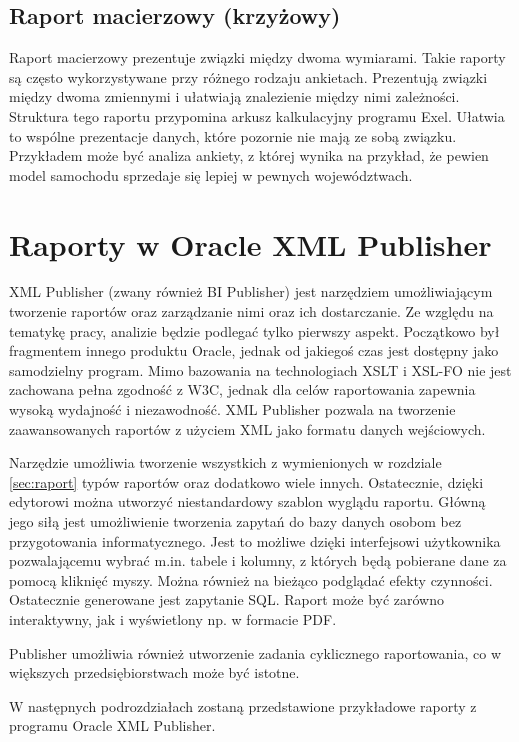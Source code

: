 \documentclass[11pt,a4paper]{article}
\begin{document}
\subsection{Raport macierzowy (krzyżowy)}\label{sec:macierzowy}
Raport macierzowy prezentuje związki między dwoma wymiarami. Takie raporty są często wykorzystywane przy różnego rodzaju ankietach. Prezentują związki między dwoma zmiennymi i ułatwiają znalezienie między nimi zależności. Struktura tego raportu przypomina arkusz kalkulacyjny programu Exel. Ułatwia to wspólne prezentacje danych, które pozornie nie mają ze sobą związku. Przykładem może być analiza ankiety, z której wynika na przykład, że pewien model samochodu sprzedaje się lepiej w pewnych województwach.
\section{Raporty w Oracle XML Publisher}\label{sec:raportOraclePublisher}
XML Publisher (zwany również BI Publisher) jest narzędziem umożliwiającym tworzenie raportów oraz zarządzanie nimi oraz ich dostarczanie. Ze względu na tematykę pracy, analizie będzie podlegać tylko pierwszy aspekt. Początkowo był fragmentem innego produktu Oracle, jednak od jakiegoś czas jest dostępny jako samodzielny program. Mimo bazowania na technologiach XSLT i XSL-FO nie jest zachowana pełna zgodność z W3C, jednak dla celów raportowania zapewnia wysoką wydajność i niezawodność. XML Publisher pozwala na tworzenie zaawansowanych raportów z użyciem XML jako formatu danych wejściowych. 

Narzędzie umożliwia tworzenie wszystkich z wymienionych w rozdziale \ref{sec:raport} typów raportów oraz dodatkowo wiele innych. Ostatecznie, dzięki edytorowi można utworzyć niestandardowy szablon wyglądu raportu. Główną jego siłą jest umożliwienie tworzenia zapytań do bazy danych osobom bez przygotowania informatycznego. Jest to możliwe dzięki interfejsowi użytkownika pozwalającemu wybrać m.in. tabele i kolumny, z których będą pobierane dane za pomocą kliknięć myszy. Można również na bieżąco podglądać efekty czynności. Ostatecznie generowane jest zapytanie SQL. Raport może być zarówno interaktywny, jak i wyświetlony np. w formacie PDF.

Publisher umożliwia również utworzenie zadania cyklicznego raportowania, co w większych przedsiębiorstwach może być istotne.

W następnych podrozdziałach zostaną przedstawione przykładowe raporty z programu Oracle XML Publisher.
\end{document}
